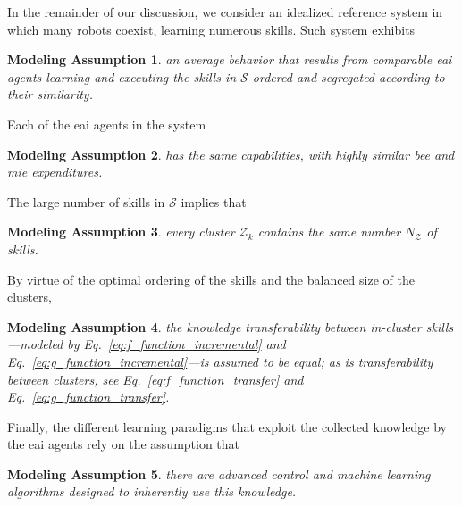 \documentclass[12pt]{article}
\newtheorem{assumption}{Modeling Assumption}
\begin{document}
In the remainder of our discussion, we consider an idealized reference system in which many robots coexist, learning numerous skills. Such system exhibits
\begin{tcolorbox}
	\begin{assumption}\label{assumption:average_behavior}
		an average behavior that results from comparable \ac{eai} agents learning and executing the skills in $\mathcal{S}$ ordered and segregated according to their similarity.
	\end{assumption}
\end{tcolorbox}
\noindent Each of the \ac{eai} agents in the system
\begin{tcolorbox}
	\begin{assumption}\label{assumption:agent_similarity}
		has the same capabilities, with highly similar \ac{bee} and \ac{mie} expenditures.
	\end{assumption}
\end{tcolorbox}
\noindent The large number of skills in $\mathcal{S}$ implies that
\begin{tcolorbox}
	\begin{assumption}\label{assumption:cluster_size}
		every cluster $\mathcal{Z}_{k}$ contains the same number $N_{\mathcal{Z}} $ of skills.
	\end{assumption}
\end{tcolorbox}
\noindent By virtue of the optimal ordering of the skills and the balanced size of the clusters,
\begin{tcolorbox}
	\begin{assumption}\label{assumption:cluster_transferability}
		the knowledge transferability between in-cluster skills---modeled by Eq.~\eqref{eq:f_function_incremental} and Eq.~\eqref{eq:g_function_incremental}---is assumed to be equal; as is transferability between clusters, see Eq.~\eqref{eq:f_function_transfer} and Eq.~\eqref{eq:g_function_transfer}.
	\end{assumption}
\end{tcolorbox}
\noindent Finally, the different learning paradigms that exploit the collected knowledge by the \ac{eai} agents rely on the assumption that
\begin{tcolorbox}
	\begin{assumption}\label{assumption:enabling_agorithms}
		there are advanced control and machine learning algorithms designed to inherently use this knowledge.
	\end{assumption}
\end{tcolorbox}
\end{document}
